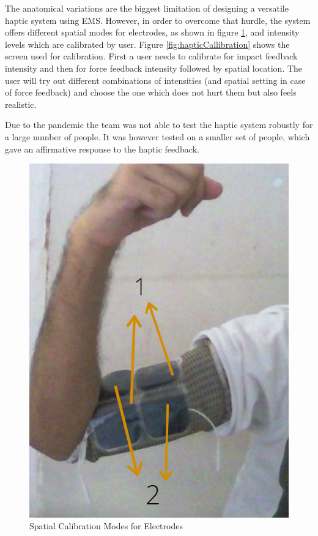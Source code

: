 The anatomical variations are the biggest limitation of designing a versatile haptic system using EMS. However, in order to overcome that hurdle, the system offers different spatial modes for electrodes, as shown in figure \ref{fig:spatialCal}, and intensity levels which are calibrated by user. Figure \ref{fig:hapticCallibration} shows the screen used for calibration. First a user needs to calibrate for impact feedback intensity and then for force feedback intensity followed by spatial location. The user will try out different combinations of intensities (and spatial setting in case of force feedback) and choose the one which does not hurt them but also feels realistic. 

Due to the pandemic the team was not able to test the haptic system robustly for a large number of people. It was however tested on a smaller set of people, which gave an affirmative response to the haptic feedback. 

\begin{figure}
    \centering
    \includegraphics[scale=.5]{images/haptics/spatial.PNG}
    \caption{Spatial Calibration Modes for Electrodes}
    \label{fig:spatialCal}
\end{figure}

